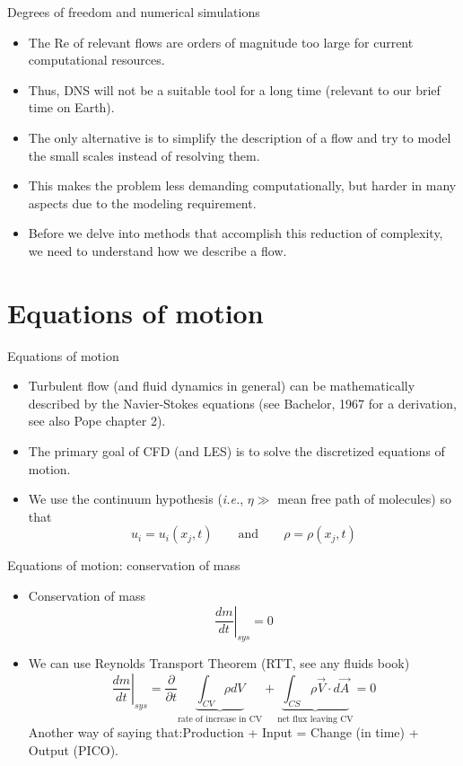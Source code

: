 \begin{frame}{Degrees of freedom and numerical simulations}

\begin{itemize}
	\item The Re of relevant flows are orders of magnitude too large for current computational resources.
	\item Thus, DNS will not be a suitable tool for a long time (relevant to our brief time on Earth).
	\item The only alternative is to simplify the description of a flow and try to model the small scales instead of resolving them.
	\item This makes the problem less demanding computationally, but harder in many aspects due to the modeling requirement.
	\item Before we delve into methods that accomplish this reduction of complexity, we need to understand how we describe a flow.
\end{itemize}
\end{frame}

\section{Equations of motion} %
\begin{frame}{Equations of motion}

\begin{itemize}
	\item Turbulent flow (and fluid dynamics in general) can be mathematically described by the Navier-Stokes equations (see Bachelor, 1967 for a derivation, see also Pope chapter 2).
	\item The primary goal of CFD (and LES) is to solve the discretized equations of motion.
	\item We use the continuum hypothesis (\textit{i.e.}, $\eta \gg$ mean free path of molecules) so that $$u_i = u_i(x_j,t) \qquad \text{and} \qquad \rho = \rho(x_j,t)$$
\end{itemize}
\end{frame}

\begin{frame}{Equations of motion: conservation of mass}

\begin{itemize}
	\item Conservation of mass $$\left.\frac{dm}{dt}\right|_{sys} = 0$$
	\item We can use Reynolds Transport Theorem (RTT, see any fluids book)
	$$\left.\frac{dm}{dt}\right|_{sys} = \frac{\partial}{\partial t} \underbrace{\int_{CV} \rho dV}_{\text{rate of increase in CV}} + \underbrace{\int_{CS} \rho \vec{V} \cdot d\vec{A}}_{\text{net flux leaving CV}} = 0$$
	Another way of saying that:\newline Production + Input = Change (in time) + Output (PICO).
\end{itemize}
\end{frame}

